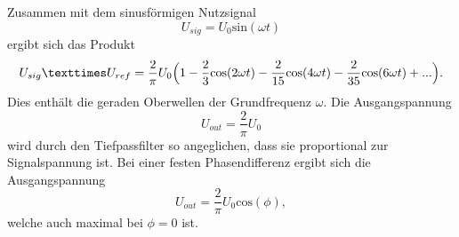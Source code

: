 Zusammen mit dem sinusförmigen Nutzsignal
\begin{equation}
    U_{sig} = U_0 \text{sin}(\omega t)
    \label{eqn:Nutzsignal}
\end{equation}
ergibt sich das Produkt
\begin{equation}
    U_{sig} \texttimes U_{ref} = \frac{2}{\pi} U_0 \Bigl(1-\frac{2}{3}\text{cos}(2\omega t)-\frac{2}{15}\text{cos}(4\omega t)-\frac{2}{35}\text{cos}(6\omega t)+...\Bigr).
\end{equation}
Dies enthält die geraden Oberwellen der Grundfrequenz $\omega$.
Die Ausgangspannung 
\begin{equation}
    U_{out} = \frac{2}{\pi} U_0
\end{equation}
wird durch den Tiefpassfilter so angeglichen, dass sie proportional zur Signalspannung ist.
Bei einer festen Phasendifferenz ergibt sich die Ausgangspannung
\begin{equation}
    U_{out} = \frac{2}{\pi}U_0 \text{cos}(\phi),
\end{equation}
welche auch maximal bei $\phi = 0$ ist.

